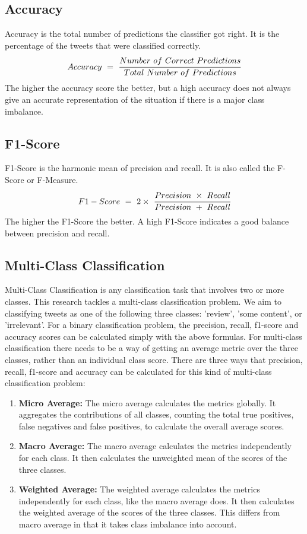 \subsection{Accuracy}
Accuracy is the total number of predictions the classifier got right. It is the percentage of the tweets that were classified correctly.
\begin{equation}
    Accuracy\ =\ \cfrac{Number\ of\ Correct\ Predictions}{Total\ Number\ of\ Predictions}
\end{equation}
The higher the accuracy score the better, but a high accuracy does not always give an accurate representation of the situation if there is a major class imbalance.

\subsection{F1-Score}
F1-Score is the harmonic mean of precision and recall. It is also called the F-Score or F-Measure. 
\begin{equation}
    F1-Score\ =\ 2 \times\ \cfrac{Precision\ \times\ Recall}{Precision\ +\ Recall}
\end{equation}
The higher the F1-Score the better. A high F1-Score indicates a good balance between precision and recall.

\subsection{Multi-Class Classification}
Multi-Class Classification is any classification task that involves two or more classes. This research tackles a multi-class classification problem. We aim to classifying tweets as one of the following three classes: 'review', 'some content', or 'irrelevant'. For a binary classification problem, the precision, recall, f1-score and accuracy scores can be calculated simply with the above formulas. For multi-class classification there needs to be a way of getting an average metric over the three classes, rather than an individual class score.
There are three ways that precision, recall, f1-score and accuracy can be calculated for this kind of multi-class classification problem:
\begin{enumerate}
    \item \textbf{Micro Average:}\newline
    The micro average calculates the metrics globally. It aggregates the contributions of all classes, counting the total true positives, false negatives and false positives, to calculate the overall average scores.  
    \item \textbf{Macro Average:}\newline
    The macro average calculates the metrics independently for each class. It then calculates the unweighted mean of the scores of the three classes.
    \item \textbf{Weighted Average:}\newline
    The weighted average calculates the metrics independently for each class, like the macro average does. It then calculates the weighted average of the scores of the three classes. This differs from macro average in that it takes class imbalance into account.
\end{enumerate}

